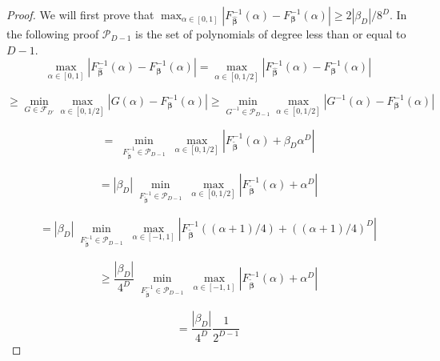 \documentclass[twoside,11pt]{article}
\begin{document}
\begin{proof}
We will first prove that $\max_{\alpha \in [0,1] }|F^{-1}_{\boldsymbol{\hat \beta}}(\alpha) - F^{-1}_{\boldsymbol{\beta}}(\alpha)|\geq 2 |\beta_{D}|/8^D$. In the following proof $\mathcal{P}_{D-1}$ is the set of polynomials of degree less than or equal to $D-1$. 
$$\max_{\alpha \in [0,1] }|F^{-1}_{\boldsymbol{\hat \beta}}(\alpha) - F^{-1}_{\boldsymbol{\beta}}(\alpha)| = \max_{\alpha \in [0,1/2] }|F^{-1}_{\boldsymbol{\hat \beta}}(\alpha) - F^{-1}_{\boldsymbol{\beta}}(\alpha)|   $$

$$\geq \min_{G \in \mathcal{F}_{D'}}\max_{\alpha \in [0,1/2] }|G(\alpha) - F^{-1}_{\boldsymbol{\beta}}(\alpha)| \geq \min_{G^{-1} \in \mathcal{P}_{D-1}}\max_{\alpha \in [0,1/2] }|G^{-1}(\alpha) - F^{-1}_{\boldsymbol{\beta}}(\alpha)|  $$
 
$$ = \min_{\begin{array}{c}
     F^{-1}_{\boldsymbol{\tilde{\beta}}} \in \mathcal{P}_{D-1}\end{array} }\max_{\alpha \in [0,1/2] }|F_{\boldsymbol{\tilde{\beta}}}^{-1}(\alpha) +\beta_D\alpha^D| $$

$$=|\beta_D| \min_{\begin{array}{c}
     F^{-1}_{\boldsymbol{\tilde{\beta}}} \in \mathcal{P}_{D-1}\end{array} }\max_{\alpha \in [0,1/2] }|F_{\boldsymbol{\tilde{\beta}}}^{-1}(\alpha)+\alpha^D | $$

$$=|\beta_D| \min_{\begin{array}{c}
     F^{-1}_{\boldsymbol{\tilde{\beta}}} \in \mathcal{P}_{D-1} \end{array} }\max_{\alpha \in [-1,1] }|F_{\boldsymbol{\tilde{\beta}}}^{-1}((\alpha+1)/4)  + ((\alpha+1)/4)^D|$$
     

$$\geq \frac{|\beta_D|}{4^D} \min_{\begin{array}{c}
     F^{-1}_{\boldsymbol{\tilde{\beta}}} \in \mathcal{P}_{D-1} \end{array} }\max_{\alpha \in [-1,1] }|F_{\boldsymbol{\tilde{\beta}}}^{-1}(\alpha) + \alpha^D|  $$

$$ = \frac{|\beta_D|}{4^D}  \frac{1}{2^{D-1}} $$


\end{proof}
\end{document}
